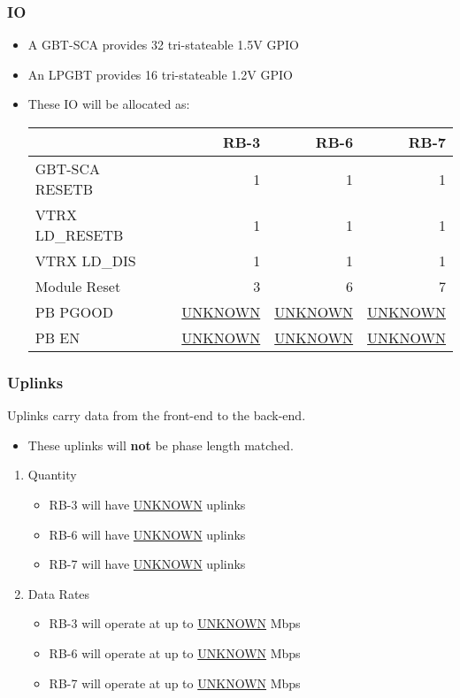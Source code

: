 \documentclass[11pt]{article}
\begin{document}
\subsubsection{IO}
\label{sec:orgdd92749}
\begin{itemize}
\item A GBT-SCA provides 32 tri-stateable 1.5V GPIO
\item An LPGBT provides 16 tri-stateable 1.2V GPIO
\item These IO will be allocated as:
\begin{center}
\begin{tabular}{llrrr}
 &  & RB-3 & RB-6 & RB-7\\
\hline
GBT-SCA RESETB &  & 1 & 1 & 1\\
VTRX LD\_RESETB &  & 1 & 1 & 1\\
VTRX LD\_DIS &  & 1 & 1 & 1\\
Module Reset &  & 3 & 6 & 7\\
PB PGOOD &  & \uline{UNKNOWN} & \uline{UNKNOWN} & \uline{UNKNOWN}\\
PB EN &  & \uline{UNKNOWN} & \uline{UNKNOWN} & \uline{UNKNOWN}\\
\end{tabular}
\end{center}
\end{itemize}

\subsubsection{Uplinks}
\label{sec:org56fab00}

Uplinks carry data from the front-end to the back-end.

\begin{itemize}
\item These uplinks will \textbf{not} be phase length matched.
\end{itemize}

\begin{enumerate}
\item Quantity
\label{sec:org6060cac}
\begin{itemize}
\item RB-3 will have \uline{UNKNOWN} uplinks
\item RB-6 will have \uline{UNKNOWN} uplinks
\item RB-7 will have \uline{UNKNOWN} uplinks
\end{itemize}
\item Data Rates
\label{sec:orgb1a492a}
\begin{itemize}
\item RB-3 will operate at up to \uline{UNKNOWN} Mbps
\item RB-6 will operate at up to \uline{UNKNOWN} Mbps
\item RB-7 will operate at up to \uline{UNKNOWN} Mbps
\end{itemize}
\end{enumerate}
\end{document}
